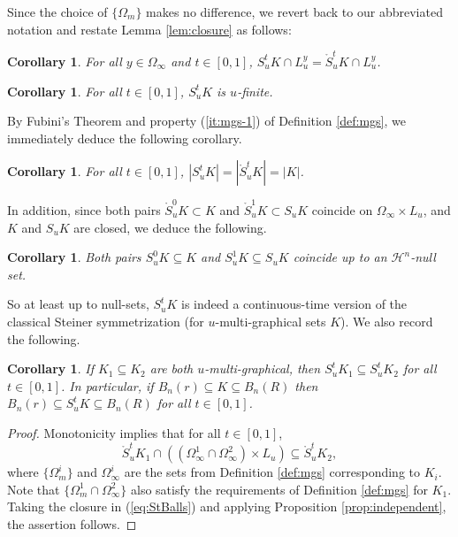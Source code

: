 \documentclass[11pt]{article}
\newtheorem{cor}[thm]{Corollary}
\theoremstyle{definition}
\theoremstyle{proof}
\DeclareMathOperator{\+}{\mathop{\tilde{+}}}
\renewcommand{\H}{\mathcal{H}}
\numberwithin{equation}{section}
\numberwithin{equation}{section}
\begin{document}
Since the choice of $\{\Omega_m\}$ makes no difference, we revert back to our abbreviated notation and restate Lemma \ref{lem:closure} as follows: 
\begin{cor} \label{cor:closure}
For all $y \in \Omega_\infty$ and $t \in [0,1]$, $S_u^t K \cap L_u^y = \mathring S_u^t K \cap L_u^y$. 
\end{cor}

\begin{cor} \label{cor:u-finite}
For all $t \in [0,1]$, $S_u^t K$ is $u$-finite. 
\end{cor}


By Fubini's Theorem and property (\ref{it:mgs-1}) of Definition \ref{def:mgs}, we immediately deduce the following corollary.
\begin{cor} \label{cor:StVolume}
For all $t \in [0,1]$, $|S_u^t K| = |\mathring S_u^t K| = |K|$. 
\end{cor}

In addition, since both pairs $\mathring S_u^0 K \subset K$ and $\mathring S_u^1 K \subset S_u K$ coincide on $\Omega_\infty \times L_u$, and $K$ and $S_u K$ are closed, we deduce the following.
\begin{cor} \label{cor:coincide}
Both pairs $S_u^0 K \subseteq K$ and $S_u^1 K \subseteq S_u K$ coincide up to an $\H^n$-null set. 
\end{cor}

So at least up to null-sets, $S_u^t K$ is indeed a continuous-time version of the classical Steiner symmetrization (for $u$-multi-graphical sets $K$). 
We also record the following.
\begin{cor} \label{cor:StBalls}
If $K_1 \subseteq K_2$ are both $u$-multi-graphical, then $S_u^t K_1 \subseteq S_u^t K_2$ for all $t \in [0,1]$. In particular, if $B_n(r) \subseteq K \subseteq B_n(R)$ then $B_n(r) \subseteq S^t_u K \subseteq B_n(R)$ for all $t \in [0,1]$. 
\end{cor}
\begin{proof}
Monotonicity implies that for all $t \in [0,1]$,
\begin{equation} \label{eq:StBalls}
\mathring S_u^t K_1 \cap ((\Omega^1_\infty \cap \Omega^2_\infty) \times L_u) \subseteq \mathring S_u^t K_2 , \end{equation}
where $\{\Omega^i_m\}$ and $\Omega^i_\infty$ are the sets from Definition \ref{def:mgs} corresponding to $K_i$. Note that $\{\Omega^1_m \cap \Omega^2_\infty\}$ 
also satisfy the requirements of Definition \ref{def:mgs} for $K_1$. Taking the closure in (\ref{eq:StBalls}) and applying Proposition \ref{prop:independent}, the assertion follows. 
\end{proof}
\end{document}
